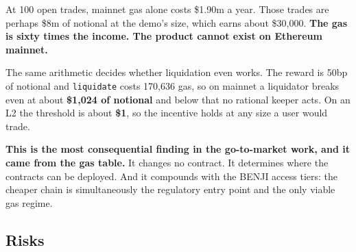 \documentclass[11pt,a4paper]{article}
\newcommand{\cbox}[1]{%
  \begin{center}\colorbox{panel}{\parbox{0.95\textwidth}{\vspace{3pt}#1\vspace{3pt}}}\end{center}}
\begin{document}
At 100 open trades, mainnet gas alone costs \$1.90m a year. Those trades are perhaps \$8m of notional
at the demo's size, which earns about \$30,000. \textbf{The gas is sixty times the income. The
product cannot exist on Ethereum mainnet.}

The same arithmetic decides whether liquidation even works. The reward is 50bp of notional and
\texttt{liquidate} costs 170,636 gas, so on mainnet a liquidator breaks even at about \textbf{\$1,024
of notional} and below that no rational keeper acts. On an L2 the threshold is about \textbf{\$1}, so
the incentive holds at any size a user would trade.

\cbox{\textbf{This is the most consequential finding in the go-to-market work, and it came from the
gas table.} It changes no contract. It determines where the contracts can be deployed. And it
compounds with the BENJI access tiers: the cheaper chain is simultaneously the regulatory entry point
and the only viable gas regime.}

\subsection{Risks}\label{sec:risks}
\end{document}
